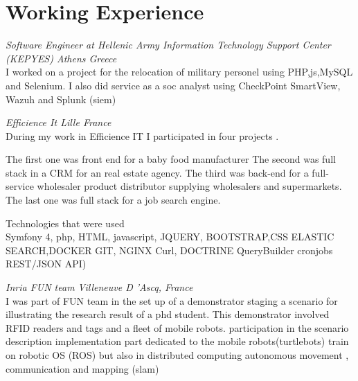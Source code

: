 \documentclass{my_cv}
\begin{document}




 \section{Working Experience}
 
 \textit{Software Engineer at Hellenic Army Information Technology Support Center (KEPYES) Athens Greece}
 \\
 I worked on a project for the relocation of military personel using PHP,js,MySQL and Selenium.
 I also did service as a soc analyst using CheckPoint SmartView, Wazuh and Splunk (siem)

 \textit{Efficience It Lille France}
\\
During my work in Efficience IT I participated in four projects  .  


\workitems
{The first one was front end for a baby food manufacturer}
{The second was full stack in a CRM for an
	real estate agency.}
{The third was back-end for a full-service wholesaler product distributor supplying wholesalers and supermarkets.}
{ The last one was full stack for a job search engine.}

Technologies that were used
\\
Symfony 4, php, HTML, javascript, JQUERY, BOOTSTRAP,CSS ELASTIC SEARCH,DOCKER
GIT, NGINX Curl, DOCTRINE QueryBuilder
cronjobs REST/JSON API)

\textit{Inria FUN team  Villeneuve D 'Ascq, France}
\\
I was part of FUN team in the set up of a demonstrator staging a scenario for illustrating the research result of a phd student. This demonstrator involved RFID
readers and tags and a fleet of mobile robots. 
\workitems
{participation in the scenario description}
{	implementation part dedicated to the mobile robots(turtlebots)}
{train on robotic OS (ROS)
	but also in distributed computing}
{autonomous movement , communication and mapping (slam) }
\end{document}

